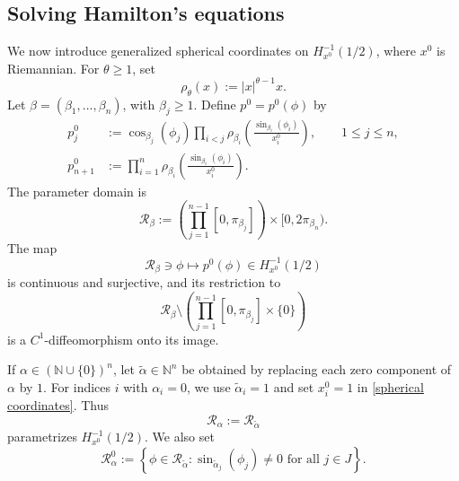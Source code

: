 \documentclass[12pt]{amsart}
\numberwithin{equation}{section}
\theoremstyle{plain}
\theoremstyle{definition}
\theoremstyle{remark}
\begin{document}
\subsection{Solving Hamilton's equations}\label{SHE}
We now introduce generalized spherical coordinates on \(H_{x^0}^{-1}(1/2)\), where
\(x^0\) is Riemannian. For \(\theta\geq 1\), set
\begin{equation}\label{e.rho}
    \rho_\theta(x):=|x|^{\theta-1}x .
\end{equation}
Let \(\beta=(\beta_1,\ldots,\beta_n)\), with \(\beta_j\geq 1\). Define
\(p^0=p^0(\phi)\) by
\begin{equation}\label{spherical coordinates}
    \begin{split}
        p^0_j
         & :=
        \cos_{\beta_j}(\phi_j)
        \prod_{i<j}
        \rho_{\beta_i}
        \left(
        \frac{\sin_{\beta_i}(\phi_i)}{x_i^0}
        \right),
        \qquad 1\leq j\leq n,
        \\
        p^0_{n+1}
         & :=
        \prod_{i=1}^n
        \rho_{\beta_i}
        \left(
        \frac{\sin_{\beta_i}(\phi_i)}{x_i^0}
        \right).
    \end{split}
\end{equation}
The parameter domain is
\begin{equation}\label{e.Rectangle}
    \mathcal R_\beta
    :=
    \left(\prod_{j=1}^{n-1}[0,\pi_{\beta_j}]\right)
    \times [0,2\pi_{\beta_n}).
\end{equation}
The map
\[
    \mathcal R_\beta\ni \phi
    \longmapsto
    p^0(\phi)\in H_{x^0}^{-1}(1/2)
\]
is continuous and surjective, and its restriction to
\[
    \mathcal R_\beta
    \setminus
    \left(
    \prod_{j=1}^{n-1}[0,\pi_{\beta_j}]
    \times\{0\}
    \right)
\]
is a \(C^1\)-diffeomorphism onto its image.

If \(\alpha\in(\mathbb N\cup\{0\})^n\), let
\(\widetilde\alpha\in\mathbb N^n\) be obtained by replacing each zero component of
\(\alpha\) by \(1\). For indices \(i\) with \(\alpha_i=0\), we use
\(\widetilde\alpha_i=1\) and set \(x_i^0=1\) in \eqref{spherical coordinates}. Thus
\[
    \mathcal R_\alpha:=\mathcal R_{\widetilde\alpha}
\]
parametrizes \(H_{x^0}^{-1}(1/2)\). We also set
\begin{equation}\label{e.R0}
    \mathcal R_\alpha^0
    :=
    \left\{
    \phi\in\mathcal R_{\widetilde\alpha}:
    \sin_{\widetilde\alpha_j}(\phi_j)\neq 0
    \text{ for all } j\in J
    \right\}.
\end{equation}
\end{document}
